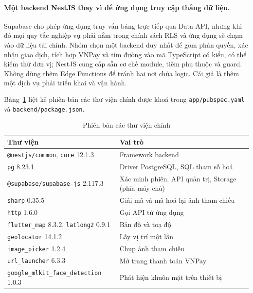 \paragraph{Một backend NestJS thay vì để ứng dụng truy cập thẳng dữ liệu.} Supabase cho phép ứng dụng truy vấn bảng trực tiếp qua Data API, nhưng khi đó mọi quy tắc nghiệp vụ phải nằm trong chính sách RLS và ứng dụng sẽ chạm vào dữ liệu tài chính. Nhóm chọn một backend duy nhất để gom phân quyền, xác nhận giao dịch, tích hợp VNPay và tìm đường vào mã TypeScript có kiểu, có thể kiểm thử đơn vị; NestJS cung cấp sẵn cơ chế module, tiêm phụ thuộc và guard. Không dùng thêm Edge Functions để tránh hai nơi chứa logic. Cái giá là thêm một dịch vụ phải triển khai và vận hành.

Bảng~\ref{tab:ch2-versions} liệt kê phiên bản các thư viện chính được khoá trong \texttt{app/\allowbreak{}pubspec.\allowbreak{}yaml} và \texttt{backend/\allowbreak{}package.\allowbreak{}json}.

\begin{table}[H]
\centering
\small
\caption{Phiên bản các thư viện chính}
\label{tab:ch2-versions}
\begin{tabularx}{\textwidth}{>{\raggedright\arraybackslash}p{}X}
\toprule
\textbf{Thư viện} & \textbf{Vai trò} \\
\midrule
\texttt{@nestjs/\allowbreak{}common}, \texttt{core} 12.1.3 & Framework backend \\
\texttt{pg} 8.23.1 & Driver PostgreSQL, SQL tham số hoá \\
\texttt{@supabase/\allowbreak{}supabase-\allowbreak{}js} 2.117.3 & Xác minh phiên, API quản trị, Storage (phía máy chủ) \\
\texttt{sharp} 0.35.5 & Giải mã và mã hoá lại ảnh tham chiếu \\
\texttt{http} 1.6.0 & Gọi API từ ứng dụng \\
\texttt{flutter\_\allowbreak{}map} 8.3.2, \texttt{latlong2} 0.9.1 & Bản đồ và toạ độ \\
\texttt{geolocator} 14.1.2 & Lấy vị trí một lần \\
\texttt{image\_\allowbreak{}picker} 1.2.4 & Chụp ảnh tham chiếu \\
\texttt{url\_\allowbreak{}launcher} 6.3.3 & Mở trang thanh toán VNPay \\
\texttt{google\_\allowbreak{}mlkit\_\allowbreak{}face\_\allowbreak{}detection} 1.0.3 & Phát hiện khuôn mặt trên thiết bị \\
\bottomrule
\end{tabularx}
\end{table}

